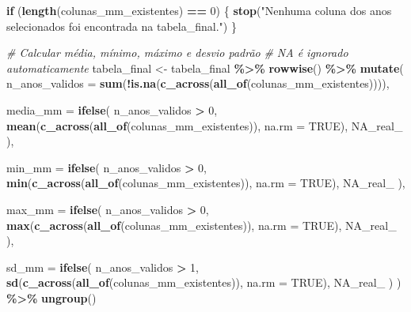 \documentclass[
]{article}
\newenvironment{Shaded}{\begin{snugshade}}{\end{snugshade}}
\newcommand{\AttributeTok}[1]{\textcolor[rgb]{0.13,0.29,0.53}{#1}}
\newcommand{\CommentTok}[1]{\textcolor[rgb]{0.56,0.35,0.01}{\textit{#1}}}
\newcommand{\ConstantTok}[1]{\textcolor[rgb]{0.56,0.35,0.01}{#1}}
\newcommand{\ControlFlowTok}[1]{\textcolor[rgb]{0.13,0.29,0.53}{\textbf{#1}}}
\newcommand{\DecValTok}[1]{\textcolor[rgb]{0.00,0.00,0.81}{#1}}
\newcommand{\FunctionTok}[1]{\textcolor[rgb]{0.13,0.29,0.53}{\textbf{#1}}}
\newcommand{\NormalTok}[1]{#1}
\newcommand{\OtherTok}[1]{\textcolor[rgb]{0.56,0.35,0.01}{#1}}
\newcommand{\SpecialCharTok}[1]{\textcolor[rgb]{0.81,0.36,0.00}{\textbf{#1}}}
\newcommand{\StringTok}[1]{\textcolor[rgb]{0.31,0.60,0.02}{#1}}
\begin{document}
\begin{Shaded}
\begin{Highlighting}[]
\ControlFlowTok{if}\NormalTok{ (}\FunctionTok{length}\NormalTok{(colunas\_mm\_existentes) }\SpecialCharTok{==} \DecValTok{0}\NormalTok{) \{}
  \FunctionTok{stop}\NormalTok{(}\StringTok{"Nenhuma coluna dos anos selecionados foi encontrada na tabela\_final."}\NormalTok{)}
\NormalTok{\}}

\CommentTok{\# Calcular média, mínimo, máximo e desvio padrão}
\CommentTok{\# NA é ignorado automaticamente}
\NormalTok{tabela\_final }\OtherTok{\textless{}{-}}\NormalTok{ tabela\_final }\SpecialCharTok{\%\textgreater{}\%}
  \FunctionTok{rowwise}\NormalTok{() }\SpecialCharTok{\%\textgreater{}\%}
  \FunctionTok{mutate}\NormalTok{(}
    \AttributeTok{n\_anos\_validos =} \FunctionTok{sum}\NormalTok{(}\SpecialCharTok{!}\FunctionTok{is.na}\NormalTok{(}\FunctionTok{c\_across}\NormalTok{(}\FunctionTok{all\_of}\NormalTok{(colunas\_mm\_existentes)))),}
    
    \AttributeTok{media\_mm =} \FunctionTok{ifelse}\NormalTok{(}
\NormalTok{      n\_anos\_validos }\SpecialCharTok{\textgreater{}} \DecValTok{0}\NormalTok{,}
      \FunctionTok{mean}\NormalTok{(}\FunctionTok{c\_across}\NormalTok{(}\FunctionTok{all\_of}\NormalTok{(colunas\_mm\_existentes)), }\AttributeTok{na.rm =} \ConstantTok{TRUE}\NormalTok{),}
      \ConstantTok{NA\_real\_}
\NormalTok{    ),}
    
    \AttributeTok{min\_mm =} \FunctionTok{ifelse}\NormalTok{(}
\NormalTok{      n\_anos\_validos }\SpecialCharTok{\textgreater{}} \DecValTok{0}\NormalTok{,}
      \FunctionTok{min}\NormalTok{(}\FunctionTok{c\_across}\NormalTok{(}\FunctionTok{all\_of}\NormalTok{(colunas\_mm\_existentes)), }\AttributeTok{na.rm =} \ConstantTok{TRUE}\NormalTok{),}
      \ConstantTok{NA\_real\_}
\NormalTok{    ),}
    
    \AttributeTok{max\_mm =} \FunctionTok{ifelse}\NormalTok{(}
\NormalTok{      n\_anos\_validos }\SpecialCharTok{\textgreater{}} \DecValTok{0}\NormalTok{,}
      \FunctionTok{max}\NormalTok{(}\FunctionTok{c\_across}\NormalTok{(}\FunctionTok{all\_of}\NormalTok{(colunas\_mm\_existentes)), }\AttributeTok{na.rm =} \ConstantTok{TRUE}\NormalTok{),}
      \ConstantTok{NA\_real\_}
\NormalTok{    ),}
    
    \AttributeTok{sd\_mm =} \FunctionTok{ifelse}\NormalTok{(}
\NormalTok{      n\_anos\_validos }\SpecialCharTok{\textgreater{}} \DecValTok{1}\NormalTok{,}
      \FunctionTok{sd}\NormalTok{(}\FunctionTok{c\_across}\NormalTok{(}\FunctionTok{all\_of}\NormalTok{(colunas\_mm\_existentes)), }\AttributeTok{na.rm =} \ConstantTok{TRUE}\NormalTok{),}
      \ConstantTok{NA\_real\_}
\NormalTok{    )}
\NormalTok{  ) }\SpecialCharTok{\%\textgreater{}\%}
  \FunctionTok{ungroup}\NormalTok{()}


\end{Highlighting}
\end{Shaded}
\end{document}
